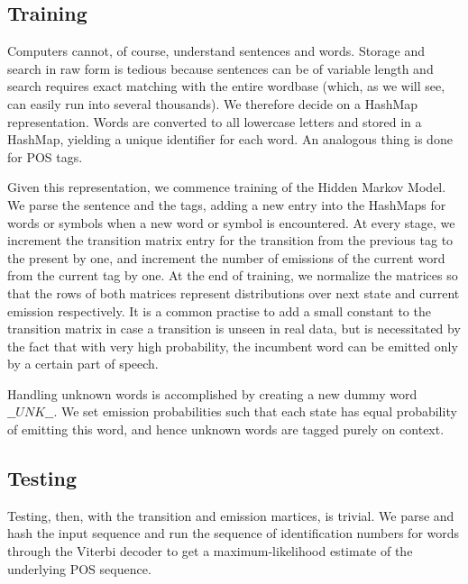 \documentclass[11pt]{article}
\begin{document}
\subsection{Training}
Computers cannot, of course, understand sentences and words. Storage and search in raw form is tedious because sentences can be of variable length and search requires exact matching with the entire wordbase (which, as we will see, can easily run into several thousands). We therefore decide on a HashMap representation. Words are converted to all lowercase letters and stored in a HashMap, yielding a unique identifier for each word. An analogous thing is done for POS tags.

Given this representation, we commence training of the Hidden Markov Model. We parse the sentence and the tags, adding a new entry into the HashMaps for words or symbols when a new word or symbol is encountered. At every stage, we increment the transition matrix entry for the transition from the previous tag to the present by one, and increment the number of emissions of the current word from the current tag by one. At the end of training, we normalize the matrices so that the rows of both matrices represent distributions over next state and current emission respectively. It is a common practise to add a small constant to the transition matrix in case a transition is unseen in real data, but is necessitated by the fact that with very high probability, the incumbent word can be emitted only by a certain part of speech.

Handling unknown words is accomplished by creating a new dummy word $\_\_ UNK \_\_$. We set emission probabilities such that each state has equal probability of emitting this word, and hence unknown words are tagged purely on context.

\subsection{Testing}
Testing, then, with the transition and emission martices, is trivial. We parse and hash the input sequence and run the sequence of identification numbers for words through the Viterbi decoder to get a maximum-likelihood estimate of the underlying POS sequence.
\end{document}
